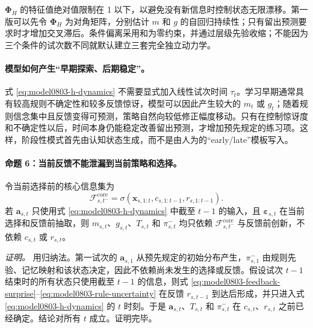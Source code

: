 $\boldsymbol\Phi_H$ 的特征值绝对值限制在 1 以下，以避免没有新信息时控制状态无限漂移。第一版可以先令 $\boldsymbol\Phi_H$ 为对角矩阵，分别估计 $m$ 和 $g$ 的自回归持续性；只有留出预测要求时才增加交叉滞后。条件偏离采用和为零约束，并通过层级先验收缩；不能因为三个条件的试次数不同就默认建立三套完全独立动力学。

\paragraph{模型如何产生“早期探索、后期稳定”。}
式 \ref{eq:model0803-h-dynamics} 不需要显式加入线性试次时间 $\tau_t$。学习早期通常具有较高规则不确定性和较多反馈惊讶，模型可以因此产生较大的 $m_t$ 或 $g_t$；随着规则信念集中且反馈变得可预测，策略自然向较低修正幅度移动。只有在控制惊讶度和不确定性以后，时间本身仍能稳定改善留出预测，才增加预先规定的练习项。这样，阶段性模式首先由认知状态生成，而不是由人为的“early/late”模板写入。

\paragraph{命题 6：当前反馈不能泄漏到当前策略和选择。}
令当前选择前的核心信息集为
\begin{equation}
    \mathcal F^{\mathrm{core}}_{s,t^-}
    =\sigma\!\left(
      \mathbf x_{s,1:t},
      c_{s,1:t-1},
      r_{s,1:t-1}
    \right).
    \label{eq:model0803-filtration}
\end{equation}
若 $\mathbf a_{s,t}$ 只使用式 \ref{eq:model0803-h-dynamics} 中截至 $t-1$ 的输入，且 $\boldsymbol\varepsilon_{s,t}$ 在当前选择和反馈前抽取，则 $m_{s,t}$、$g_{s,t}$、$T_{s,t}$ 和 $\pi^-_{s,t}$ 均只依赖 $\mathcal F^{\mathrm{core}}_{s,t^-}$ 与反馈前创新，不依赖 $c_{s,t}$ 或 $r_{s,t}$。

\textit{证明。}
用归纳法。第一试次的 $\mathbf a_{s,1}$ 从预先规定的初始分布产生，$\pi^-_{s,1}$ 由规则先验、记忆映射和该状态决定，因此不依赖尚未发生的选择或反馈。假设试次 $t-1$ 结束时的所有状态只使用截至 $t-1$ 的信息，则式 \ref{eq:model0803-feedback-surprise}--\ref{eq:model0803-rule-uncertainty} 在反馈 $r_{s,t-1}$ 到达后形成，并只进入式 \ref{eq:model0803-h-dynamics} 的 $t$ 时刻。于是 $\mathbf a_{s,t}$、$T_{s,t}$ 和 $\pi^-_{s,t}$ 在 $c_{s,t}$、$r_{s,t}$ 之前已经确定。结论对所有 $t$ 成立。证明完毕。

